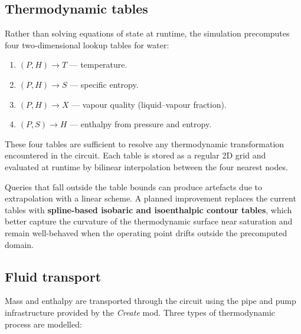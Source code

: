 \documentclass{report}
\begin{document}
\subsection{Thermodynamic tables}

Rather than solving equations of state at runtime, the simulation precomputes four
two-dimensional lookup tables for water:
\begin{enumerate}
    \item $(P, H) \rightarrow T$ — temperature.
    \item $(P, H) \rightarrow S$ — specific entropy.
    \item $(P, H) \rightarrow X$ — vapour quality (liquid--vapour fraction).
    \item $(P, S) \rightarrow H$ — enthalpy from pressure and entropy.
\end{enumerate}
These four tables are sufficient to resolve any thermodynamic transformation encountered
in the circuit. Each table is stored as a regular 2D grid and evaluated at runtime by
bilinear interpolation between the four nearest nodes.

Queries that fall outside the table bounds can produce artefacts due to extrapolation
with a linear scheme. A planned improvement replaces the current tables with
\textbf{spline-based isobaric and isoenthalpic contour tables}, which better capture
the curvature of the thermodynamic surface near saturation and remain well-behaved when
the operating point drifts outside the precomputed domain.

\subsection{Fluid transport}

Mass and enthalpy are transported through the circuit using the pipe and pump
infrastructure provided by the \textit{Create} mod. Three types of thermodynamic
process are modelled:
\end{document}
